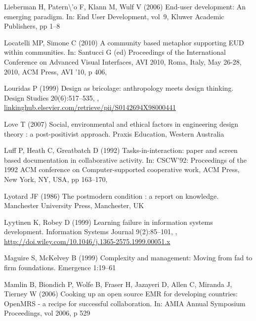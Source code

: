 \documentclass{article}
\begin{document}
\begin{thebibliography}{193}
Lieberman H, Patern{\textbackslash}'{o} F, Klann M, Wulf V (2006) End-user
  development: An emerging paradigm. In: End User Development, vol~9, Kluwer
  Academic Publishers, pp 1--8

Locatelli MP, Simone C (2010) A community based metaphor supporting {EUD}
  within communities. In: Santucci G (ed) Proceedings of the International
  Conference on Advanced Visual Interfaces, {AVI} 2010, Roma, Italy, May 26-28,
  2010, {ACM} Press, {AVI} '10, p 406,

Louridas P (1999) Design as bricolage: anthropology meets design thinking.
  Design Studies 20(6):517--535, ,
  \urlprefix\url{linkinghub.elsevier.com/retrieve/pii/S0142694X98000441}

Love T (2007) Social, environmental and ethical factors in engineering design
  theory : a post-positivist approach. Praxis Education, Western Australia

Luff P, Heath C, Greatbatch D (1992) Tasks-in-interaction: paper and screen
  based documentation in collaborative activity. In: {CSCW'92:} Proceedings of
  the 1992 {ACM} conference on Computer-supported cooperative work, {ACM}
  Press, New York, {NY}, {USA}, pp 163--170, 

Lyotard JF (1986) The postmodern condition : a report on knowledge. Manchester
  University Press, Manchester, {UK}

Lyytinen K, Robey D (1999) Learning failure in information systems development.
  Information Systems Journal 9(2):85--101,
  ,
  \urlprefix\url{http://doi.wiley.com/10.1046/j.1365-2575.1999.00051.x}

Maguire S, {McKelvey} B (1999) Complexity and management: Moving from fad to
  firm foundations. Emergence 1:19--61

Mamlin B, Biondich P, Wolfe B, Fraser H, Jazayeri D, Allen C, Miranda J,
  Tierney W (2006) Cooking up an open source {EMR} for developing countries:
  {OpenMRS} - a recipe for successful collaboration. In: {AMIA} Annual
  Symposium Proceedings, vol 2006, p 529


\end{thebibliography}
\end{document}

